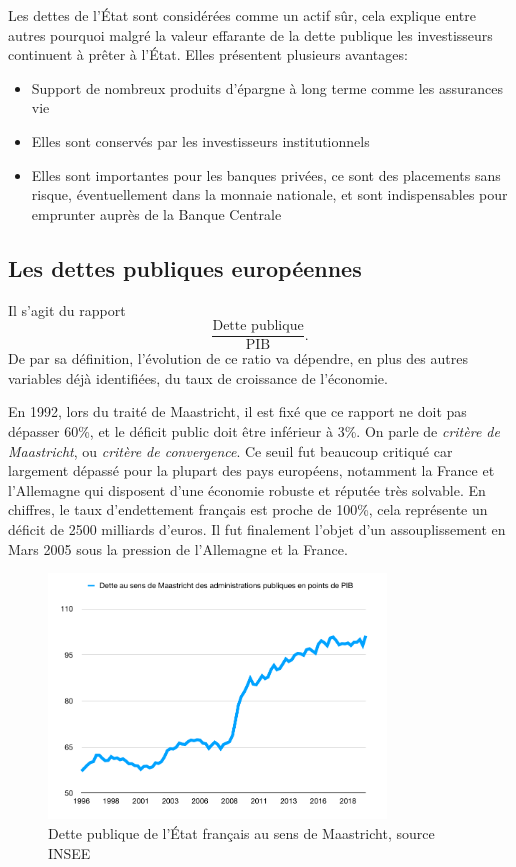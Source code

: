 \documentclass[main.tex]{subfiles}
\begin{document}
Les dettes de l'État sont considérées comme un actif sûr, cela explique entre autres pourquoi malgré la valeur effarante de la dette publique les investisseurs continuent à prêter à l'État. Elles présentent plusieurs avantages:
\begin{itemize}
        \item Support de nombreux produits d'épargne à long terme comme les assurances vie
        \item Elles sont conservés par les investisseurs institutionnels
        \item Elles sont importantes pour les banques privées, ce sont des placements sans risque, éventuellement dans la monnaie nationale, et sont indispensables pour emprunter auprès de la Banque Centrale
\end{itemize}

\subsection{Les dettes publiques européennes}

\begin{definition}
       Il s'agit du rapport \[
               \frac{\text{Dette publique}}{\text{PIB}}
       .\] De par sa définition, l'évolution de ce ratio va dépendre, en plus des autres variables déjà identifiées, du taux de croissance de l'économie. 

\end{definition}

En 1992, lors du traité de Maastricht, il est fixé que ce rapport ne doit pas dépasser 60\%, et le déficit public doit être inférieur à 3\%. On parle de \emph{critère de Maastricht}, ou \emph{critère de convergence}. Ce seuil fut beaucoup critiqué car largement dépassé pour la plupart des pays européens, notamment la France et l'Allemagne qui disposent d'une économie robuste et réputée très solvable. En chiffres, le taux d'endettement français est proche de 100\%, cela représente un déficit de 2500 milliards d'euros. Il fut finalement  l'objet d'un assouplissement en Mars 2005 sous la pression de l'Allemagne et la France. \\
\begin{figure}[h!]
        \centering
        \includegraphics[width=0.8\textwidth]{dette_maa.pdf}
        \caption{Dette publique de l'État français au sens de Maastricht, source INSEE}
        \label{fig:dette_maa-pdf}
\end{figure}
\end{document}
